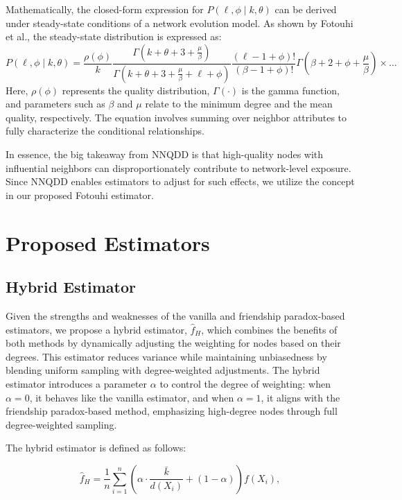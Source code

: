 \documentclass{article}
\begin{document}
Mathematically, the closed-form expression for \( P(\ell, \phi \mid k, \theta) \) can be derived under steady-state conditions of a network evolution model. As shown by Fotouhi et al., the steady-state distribution is expressed as:
\begin{equation}
P(\ell, \phi \mid k, \theta) = \frac{\rho(\phi)}{k} \frac{\Gamma\left(k + \theta + 3 + \frac{\mu}{\beta}\right)}{\Gamma\left(k + \theta + 3 + \frac{\mu}{\beta} + \ell + \phi\right)} \frac{(\ell - 1 + \phi)!}{(\beta - 1 + \phi)!} \Gamma\left(\beta + 2 + \phi + \frac{\mu}{\beta}\right) \times \dots
\end{equation}
Here, \( \rho(\phi) \) represents the quality distribution, \( \Gamma(\cdot) \) is the gamma function, and parameters such as \( \beta \) and \( \mu \) relate to the minimum degree and the mean quality, respectively. The equation involves summing over neighbor attributes to fully characterize the conditional relationships. 

In essence, the big takeaway from NNQDD is that high-quality nodes with influential neighbors can disproportionately contribute to network-level exposure. Since NNQDD enables estimators to adjust for such effects, we utilize the concept in our proposed Fotouhi estimator.

\section{Proposed Estimators}

\subsection{Hybrid Estimator}

Given the strengths and weaknesses of the vanilla and friendship paradox-based estimators, we propose a hybrid estimator, \( \hat{f}_H \), which combines the benefits of both methods by dynamically adjusting the weighting for nodes based on their degrees. This estimator reduces variance while maintaining unbiasedness by blending uniform sampling with degree-weighted adjustments. The hybrid estimator introduces a parameter \( \alpha \) to control the degree of weighting: when \( \alpha = 0 \), it behaves like the vanilla estimator, and when \( \alpha = 1 \), it aligns with the friendship paradox-based method, emphasizing high-degree nodes through full degree-weighted sampling.

The hybrid estimator is defined as follows:

\begin{equation} \label{eq:hybrid_estimator}
\hat{f}_H = \frac{1}{n} \sum_{i=1}^n \left( \alpha \cdot \frac{\bar{k}}{d(X_i)} + (1 - \alpha) \right) f(X_i),
\end{equation}
\end{document}
